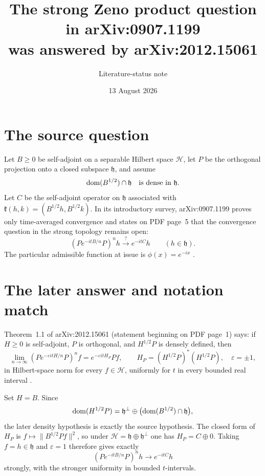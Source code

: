 \documentclass[11pt]{article}
\title{The strong Zeno product question in arXiv:0907.1199\\
was answered by arXiv:2012.15061}
\author{Literature-status note}
\date{13 August 2026}
\begin{document}
\maketitle

\begin{center}
\end{center}

\section{The source question}

Let $B\ge0$ be self-adjoint on a separable Hilbert space $\mathcal H$, let
$P$ be the orthogonal projection onto a closed subspace $\mathfrak h$, and
assume
\[
 \mathop{\rm dom}(B^{1/2})\cap\mathfrak h
 \quad\hbox{is dense in }\mathfrak h.
\]
Let $C$ be the self-adjoint operator on $\mathfrak h$ associated with
$\mathfrak k(h,k)=(B^{1/2}h,B^{1/2}k)$.  In its introductory survey,
arXiv:0907.1199 proves only time-averaged convergence and states on PDF
page~5 that the convergence question in the strong topology remains open:
\[
 \left(Pe^{-itB/n}P\right)^n h\stackrel{?}{\longrightarrow}e^{-itC}h
 \qquad(h\in\mathfrak h).
\]
The particular admissible function at issue is $\phi(x)=e^{-ix}$
\cite{EN09}.

\section{The later answer and notation match}

Theorem~1.1 of arXiv:2012.15061 (statement beginning on PDF page~1) says:
if $H\ge0$ is self-adjoint, $P$ is orthogonal, and $H^{1/2}P$ is densely
defined, then
\[
 \lim_{n\to\infty}\left(Pe^{-\varepsilon itH/n}P\right)^n f
 =e^{-\varepsilon itH_P}Pf,
 \qquad
 H_P=(H^{1/2}P)^*(H^{1/2}P),\quad \varepsilon=\pm1,
\]
in Hilbert-space norm for every $f\in\mathcal H$, uniformly for $t$ in
every bounded real interval \cite{EI20}.

Set $H=B$.  Since
\[
 \mathop{\rm dom}(H^{1/2}P)
 =\mathfrak h^\perp\oplus
   \bigl(\mathop{\rm dom}(B^{1/2})\cap\mathfrak h\bigr),
\]
the later density hypothesis is exactly the source hypothesis.  The closed
form of $H_P$ is $f\mapsto\|B^{1/2}Pf\|^2$, so under
$\mathcal H=\mathfrak h\oplus\mathfrak h^\perp$ one has
$H_P=C\oplus0$.  Taking $f=h\in\mathfrak h$ and $\varepsilon=1$ therefore
gives exactly
\[
 \boxed{\left(Pe^{-itB/n}P\right)^n h\longrightarrow e^{-itC}h}
\]
strongly, with the stronger uniformity in bounded $t$-intervals.
\end{document}
